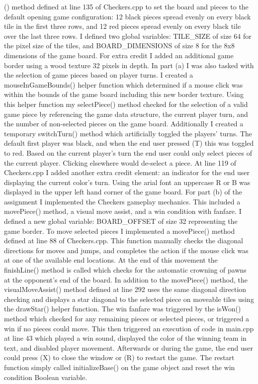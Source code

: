\documentclass[12pt]{article}
\begin{document}
\begin{minipage}{\dimexpr\textwidth-1cm}
() method defined at line 135 of Checkers.cpp to set the board and pieces to the default opening game configuration: 12 black pieces spread evenly on every black tile in the first three rows, and 12 red pieces spread evenly on every black tile over the last three rows. I defined two global variables: TILE\_SIZE of size 64 for the pixel size of the tiles, and BOARD\_DIMENSIONS of size 8 for the 8x8 dimensions of the game board. For extra credit I added an additional game border using a wood texture 32 pixels in depth. In part (a) I was also tasked with the selection of game pieces based on player turns. I created a mouseInGameBounds() helper function which determined if a mouse click was within the bounds of the game board including this new border texture. Using this helper function my selectPiece() method checked for the selection of a valid game piece by referencing the game data structure, the current player turn, and the number of non-selected pieces on the game board. Additionally I created a temporary switchTurn() method which artificially toggled the players’ turns. The default first player was black, and when the end user pressed (T) this was toggled to red. Based on the current player’s turn the end user could only select pieces of the current player. Clicking elsewhere would de-select a piece. At line 119 of Checkers.cpp I added another extra credit element: an indicator for the end user displaying the current color’s turn. Using the arial font an uppercase R or B was displayed in the upper left hand corner of the game board. \newline
\newline
For part (b) of the assignment I implemented the Checkers gameplay mechanics. This included a movePiece() method, a visual move assist, and a win condition with fanfare. I defined a new global variable: BOARD\_OFFSET of size 32 representing the game border. To move selected pieces I implemented a movePiece() method defined at line 88 of Checkers.cpp. This function manually checks the diagonal directions for moves and jumps, and completes the action if the mouse click was at one of the available end locations. At the end of this movement the finishLine() method is called which checks for the automatic crowning of pawns at the opponent’s end of the board. In addition to the movePiece() method, the visualMoveAssist() method defined at line 292 uses the same diagonal direction checking and displays a star diagonal to the selected piece on moveable tiles using the drawStar() helper function. The win fanfare was triggered by the isWon() method which checked for any remaining pieces or selected pieces, or triggered a win if no pieces could move. This then triggered an execution of code in main.cpp at line 43 which played a win sound, displayed the color of the winning team in text, and disabled player movement. Afterwards or during the game, the end user could press (X) to close the window or (R) to restart the game. The restart function simply called initializeBase() on the game object and reset the win condition Boolean variable.
\end{minipage}
\end{document}
